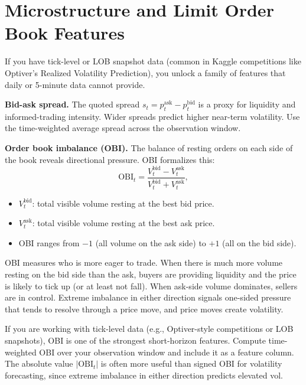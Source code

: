 \section{Microstructure and Limit Order Book Features}\label{sec:feat-micro}

If you have tick-level or LOB snapshot data (common in Kaggle competitions like Optiver's Realized Volatility Prediction), you unlock a family of features that daily or 5-minute data cannot provide.

\textbf{Bid-ask spread.}
The quoted spread $s_t = p_t^{\text{ask}} - p_t^{\text{bid}}$ is a proxy for liquidity and informed-trading intensity.
Wider spreads predict higher near-term volatility.
Use the time-weighted average spread across the observation window.

\textbf{Order book imbalance (OBI).}
The balance of resting orders on each side of the book reveals directional pressure. OBI formalizes this:
\begin{equation}\label{eq:obi}
\text{OBI}_t = \frac{V_t^{\text{bid}} - V_t^{\text{ask}}}{V_t^{\text{bid}} + V_t^{\text{ask}}},
\end{equation}
\begin{itemize}[nosep]
  \item $V_t^{\text{bid}}$: total visible volume resting at the best bid price.
  \item $V_t^{\text{ask}}$: total visible volume resting at the best ask price.
  \item OBI ranges from $-1$ (all volume on the ask side) to $+1$ (all on the bid side).
\end{itemize}

\begin{intuition}
OBI measures who is more eager to trade. When there is much more volume resting on the bid side than the ask, buyers are providing liquidity and the price is likely to tick up (or at least not fall). When ask-side volume dominates, sellers are in control. Extreme imbalance in either direction signals one-sided pressure that tends to resolve through a price move, and price moves create volatility.
\end{intuition}

\begin{projectconnection}
If you are working with tick-level data (e.g., Optiver-style competitions or LOB snapshots), OBI is one of the strongest short-horizon features. Compute time-weighted OBI over your observation window and include it as a feature column. The absolute value $|\text{OBI}_t|$ is often more useful than signed OBI for volatility forecasting, since extreme imbalance in either direction predicts elevated vol.
\end{projectconnection}

